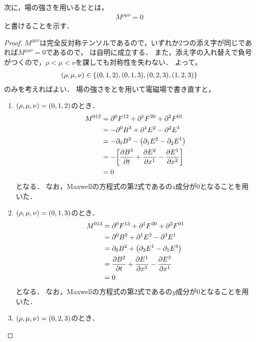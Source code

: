 \documentclass{report}
\begin{document}
    次に，場の強さを用いるととは，
    \begin{align}
      M^{\rho\mu\nu} = 0\label{maxwell-12-1}
    \end{align}
    と書けることを示す．
    \begin{proof}
      $M^{\rho\mu\nu}$は完全反対称テンソルであるので，いずれか2つの添え字が同じであれば$M^{\rho\mu\nu} = 0$であるので，
      は自明に成立する．
      また，添え字の入れ替えで負号がつくので，$\rho < \mu < \nu$を課しても対称性を失わない．
      よって，
      \begin{align}
        \qty(\rho, \mu, \nu) \in \qty{(0, 1, 2), (0, 1, 3), (0, 2, 3), (1, 2, 3)}
      \end{align}
      のみを考えればよい．
      場の強さをとを用いて電磁場で書き直すと，
      \begin{enumerate}
        \item $\qty(\rho, \mu, \nu) = (0, 1, 2)$のとき．
          \begin{align}
            M^{012} &= \partial^0F^{12} + \partial^1F^{20} + \partial^2F^{01} \\ 
            &= -\partial^0B^3 + \partial^1E^2 - \partial^2E^1 \\ 
            &= -\partial_0B^3 -\qty(\partial_1E^2 - \partial_2E^1) \\ 
            &= -\qty[\pdv{B^3}{t} + \pdv{E^2}{x^1} - \pdv{E^1}{x^2}] \\ 
            &= 0
          \end{align}
          となる．
          なお，Maxwellの方程式の第2式であるの$z$成分が0となることを用いた．
        \item $\qty(\rho, \mu, \nu) = (0, 1, 3)$のとき．
          \begin{align}
            M^{013} &= \partial^0F^{13} + \partial^1F^{30} + \partial^3F^{01} \\ 
            &= \partial^0B^2 + \partial^1E^2 - \partial^3E^1 \\ 
            &= \partial_0B^2 + \qty(\partial_3E^1 - \partial_1E^3) \\ 
            &= \pdv{B^2}{t} + \pdv{E^1}{x^3} - \pdv{E^3}{x^1} \\ 
            &= 0
          \end{align}
          となる．
          なお，Maxwellの方程式の第2式であるの$y$成分が0となることを用いた．
        \item $\qty(\rho, \mu, \nu) = (0, 2, 3)$のとき．

\end{enumerate}
\end{proof}
\end{document}
